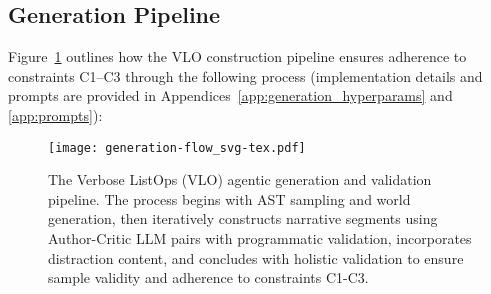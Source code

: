 \documentclass{article}
\begin{document}
\subsection{Generation Pipeline}
\label{subsec:generation}
Figure~\ref{fig:pipeline1} outlines how the VLO construction pipeline ensures adherence to constraints C1–C3 through the following process (implementation details and prompts are provided in Appendices~\ref{app:generation_hyperparams} and \ref{app:prompts}):

\begin{figure}[h]
  \centering
  \texttt{[image: generation-flow\_svg-tex.pdf]}
  \caption{The Verbose ListOps (VLO) agentic generation and validation pipeline. The process begins with AST sampling and world generation, then iteratively constructs narrative segments using Author-Critic LLM pairs with programmatic validation, incorporates distraction content, and concludes with holistic validation to ensure sample validity and adherence to constraints C1-C3.}
  \label{fig:pipeline1}
\end{figure}
\end{document}

